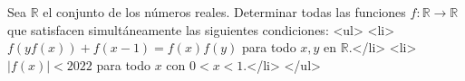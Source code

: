 Sea $\mathbb R$ el conjunto de los números reales. Determinar todas las funciones $f: \mathbb R \to \mathbb R$ que satisfacen simultáneamente las siguientes condiciones:
<ul>
<li>$f(yf(x))+f(x-1)=f(x)f(y)$ para todo $x,y$ en $\mathbb R$.</li>
<li>$|f(x)|\lt 2022$ para todo $x$ con $0\lt x \lt 1$.</li>
</ul>
